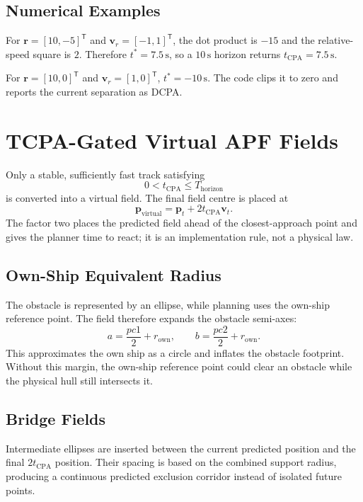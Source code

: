 \documentclass[11pt,a4paper]{article}
\begin{document}
\subsection{Numerical Examples}
For \(\bm{r}=[10,-5]^{\mathsf T}\) and \(\bm{v}_r=[-1,1]^{\mathsf T}\), the dot product is \(-15\) and the relative-speed square is \(2\). Therefore \(t^*=7.5\,\mathrm{s}\), so a \(10\,\mathrm{s}\) horizon returns \(t_{\mathrm{CPA}}=7.5\,\mathrm{s}\).

For \(\bm{r}=[10,0]^{\mathsf T}\) and \(\bm{v}_r=[1,0]^{\mathsf T}\), \(t^*=-10\,\mathrm{s}\). The code clips it to zero and reports the current separation as DCPA.




\section{TCPA-Gated Virtual APF Fields}

Only a stable, sufficiently fast track satisfying
\[
0<t_{\mathrm{CPA}}\leq T_{\mathrm{horizon}}
\]
is converted into a virtual field. The final field centre is placed at
\[
\bm{p}_{\mathrm{virtual}}=\bm{p}_t+2t_{\mathrm{CPA}}\bm{v}_t.
\]
The factor two places the predicted field ahead of the closest-approach point and gives the planner time to react; it is an implementation rule, not a physical law.

\subsection{Own-Ship Equivalent Radius}
The obstacle is represented by an ellipse, while planning uses the own-ship reference point. The field therefore expands the obstacle semi-axes:
\[
a=\frac{pc1}{2}+r_{\mathrm{own}},\qquad b=\frac{pc2}{2}+r_{\mathrm{own}}.
\]
This approximates the own ship as a circle and inflates the obstacle footprint. Without this margin, the own-ship reference point could clear an obstacle while the physical hull still intersects it.

\subsection{Bridge Fields}
Intermediate ellipses are inserted between the current predicted position and the final \(2t_{\mathrm{CPA}}\) position. Their spacing is based on the combined support radius, producing a continuous predicted exclusion corridor instead of isolated future points.
\end{document}

